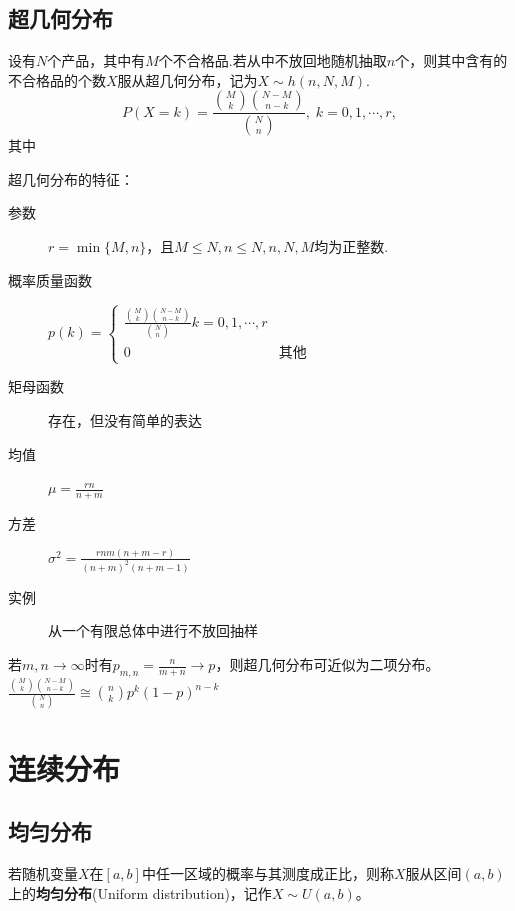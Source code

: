\subsection{超几何分布}

\begin{definition}
    设有$N$个产品，其中有$M$个不合格品.若从中不放回地随机抽取$n$个，则其中含有的不合格品的个数$X$服从超几何分布，记为$X\sim h(n,N,M)$.
    \begin{equation}\label{eq2.4.6}
        P(X = k) = \frac{\binom Mk \binom{N-M}{n-k}} {\binom Nn},\; k = 0,1,\cdots,r,
    \end{equation}
    其中
\end{definition}

超几何分布的特征：
\begin{description}
    \item[参数] $r=\min\{M,n\}$，且$M\le N,n\le N,n,N,M$均为正整数.
    \item[概率质量函数] $p(k)=\begin{cases}
                \frac{\binom Mk \binom{N-M}{n-k}} {\binom Nn}  k = 0,1,\cdots,r \\
                0 & \text{其他}
            \end{cases}$
    \item[矩母函数] 存在，但没有简单的表达
    \item[均值] $\mu=\frac{rn}{n+m}$
    \item[方差] $\sigma^2=\frac{rnm(n+m-r)}{(n+m)^2(n+m-1)}$
    \item[实例] 从一个有限总体中进行不放回抽样
\end{description}

\begin{remark}
    若$m,n \to \infty$时有$p_{m,n}=\frac{n}{m+n} \to p$，则超几何分布可近似为二项分布。
    $\frac{\binom {M}{k} \binom{N-M}{n-k}} {\binom {N}{n}}
        \cong \binom{n}{k}p^k(1-p)^{n-k}$
\end{remark}

\section{连续分布}

\subsection{均匀分布}

\begin{definition}
    若随机变量$X$在$[a,b]$中任一区域的概率与其测度成正比，则称$X$服从区间$(a,b)$上的\textbf{均匀分布}(Uniform distribution)，记作$X\sim U(a,b)$。
\end{definition}

